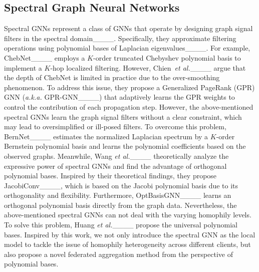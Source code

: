 \subsection{Spectral Graph Neural Networks}
Spectral GNNs represent a class of GNNs that operate by designing graph signal filters in the spectral domain____. Specifically, they approximate filtering operations using polynomial bases of Laplacian eigenvalues____. For example, ChebNet____ employs a $K$-order truncated Chebyshev polynomial basis to implement a $K$-hop localized filtering. However, Chien~\textit{et al.}____ argue that the depth of ChebNet is limited in practice due to the over-smoothing phenomenon. To address this issue, they propose a Generalized PageRank (GPR) GNN (\textit{a.k.a.} GPR-GNN____) that adaptively learns the GPR weights to control the contribution of each propagation step. However, the above-mentioned spectral GNNs learn the graph signal filters without a clear constraint, which may lead to oversimplified or ill-posed filters. To overcome this problem, BernNet____ estimates the normalized Laplacian spectrum by a $K$-order Bernstein polynomial basis and learns the polynomial coefficients based on the observed graphs. Meanwhile, Wang \textit{et al.}____ theoretically analyze the expressive power of spectral GNNs and find the advantage of orthogonal polynomial bases. Inspired by their theoretical findings, they propose JacobiConv____, which is based on the Jacobi polynomial basis due to its orthogonality and flexibility. Furthermore, OptBasisGNN____ learns an orthogonal polynomial basis directly from the graph data. Nevertheless, the above-mentioned spectral GNNs can not deal with the varying homophily levels. To solve this problem, Huang \textit{et al.}____ propose the universal polynomial bases. Inspired by this work, we not only introduce the spectral GNN as the local model to tackle the issue of homophily heterogeneity across different clients, but also propose a novel federated aggregation method from the perspective of polynomial bases.